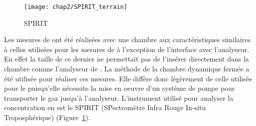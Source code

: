 \begin{figure}
\texttt{[image: chap2/SPIRIT\_terrain]}
\caption{SPIRIT}
\label{fig:SPIRIT}
\end{figure}

Les mesures de \chh ont été réalisées avec une chambre aux caractéristiques similaires à celles utilisées pour les mesures de \coo à l'exception de l'interface avec l'analyseur.
En effet la taille de ce dernier ne permettait pas de l'insérer directement dans la chambre comme l'analyseur de \coo.
La méthode de la chambre dynamique fermée a été utilisée pour réaliser ces mesures.
Elle diffère donc légèrement de celle utilisée pour le \coo puisqu'elle nécessite la mise en oeuvre d'un système de pompe pour transporter le gaz jusqu'à l'analyseur.
L'instrument utilisé pour analyser la concentration en \chh est le SPIRIT (SPectromètre Infra Rouge In-situ Troposphérique) (Figure~\ref{fig:SPIRIT}).

